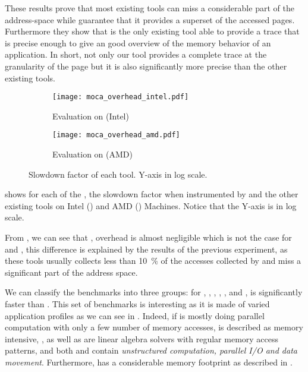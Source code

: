 These results prove that most existing tools can miss a considerable part of
the address-space while \Moca guarantee that it provides a superset of the accessed
pages. Furthermore they show that \Moca is the only existing tool able to provide a
trace that is precise enough to give an good overview of the memory behavior of an application. In
short, not only our tool provides a complete trace at the granularity of the
page but it is also significantly more precise than the other existing tools.

\begin{figure}[htb]
    \centering
    \begin{subfigure}{\linewidth}
        \texttt{[image: moca\_overhead\_intel.pdf]}
        \caption{Evaluation on \Edel (Intel)}
        \label{fig:ovh-Intel}
    \end{subfigure}
    \begin{subfigure}{\linewidth}
        \texttt{[image: moca\_overhead\_amd.pdf]}
        \caption{Evaluation on \Stremi (AMD)}
        \label{fig:ovh-AMD}
    \end{subfigure}
    \caption{Slowdown factor of each tool.
    Y-axis in log scale.}
    \label{fig:ovh}
\end{figure}

 shows for each of the \NPB, the slowdown factor when
instrumented by \Moca and the other existing tools on Intel
() and AMD () Machines. Notice that the Y-axis is in
log scale.

From , we can see that \Mitos, \MitosTun overhead is
almost negligible which is not the case for \Moca and \TABARNAC, this
difference is explained by the results of the previous experiment, as these
tools usually collects less than \SI{10}{\%} of the accesses collected by \Moca and
miss a significant part of the address space.

We can classify the benchmarks into three groups:
for \BT, \CG, \DC,  \EP, \LU, \SP and \UA, \Moca is
significantly faster than \TABARNAC. This set of benchmarks is interesting as
it is made of varied application profiles as we can see in .
Indeed, if \EP is mostly doing parallel computation with only a few number of
memory accesses, \CG is described as memory intensive,
\BT, \LU as well as \SP are linear algebra solvers with regular memory access patterns,
and both \UA and \DC contain \emph{unstructured computation,
parallel I/O and data movement}. Furthermore, \DC has a considerable memory footprint as
described in .

